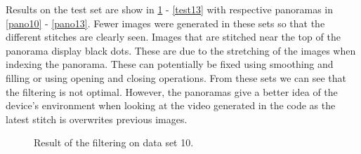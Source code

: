 \documentclass[letterpaper, 10 pt, conference]{ieeeconf}  %
\begin{document}
Results on the test set are show in \ref{test10} - \ref{test13} with respective panoramas in \ref{pano10} - \ref{pano13}. Fewer images were generated in these sets so that the different stitches are clearly seen. Images that are stitched near the top of the panorama display black dots. These are due to the stretching of the images when indexing the panorama. These can potentially be fixed using smoothing and filling or using opening and closing operations. From these sets we can see that the filtering is not optimal. However, the panoramas give a better idea of the device's environment when looking at the video generated in the code as the latest stitch is overwrites previous images. 

   \begin{figure}[thpb]
      \centering
      
      \caption{Result of the filtering on data set 10.}
      \label{test10}
   \end{figure}
   
\end{document}
